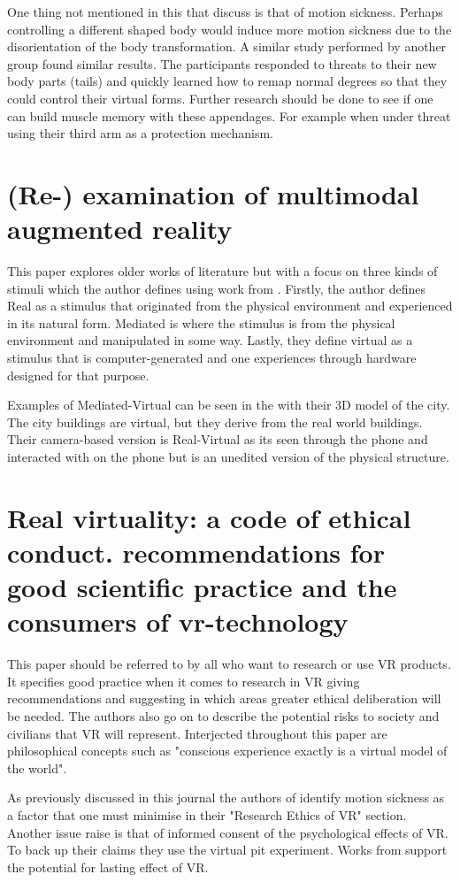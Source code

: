 \documentclass{scrartcl}
\begin{document}
 One thing not mentioned in this that \cite{mentzelopoulos2015hardware} discuss is that of motion sickness. Perhaps controlling a different shaped body would induce more motion sickness due to the disorientation of the body transformation. A similar study performed by another group found similar results\cite{steptoe2013human}. The participants responded to threats to their new body parts (tails) and quickly learned how to remap normal degrees so that they could control their virtual forms. Further research should be done to see if one can build muscle memory with these appendages. For example when under threat using their third arm as a protection mechanism\cite{chafe1996musical}.

\section {(Re-) examination of multimodal augmented reality\cite{rosa2016re}}
This paper explores older works of literature but with a focus on three kinds of stimuli which the author defines using work from \cite{bach2003sensory,milgram1994taxonomy,bayart2006haptic}. Firstly, the author defines Real as a stimulus that originated from the physical environment and experienced in its natural form. Mediated is where the stimulus is from the physical environment and manipulated in some way. Lastly, they define virtual as a stimulus that is computer-generated and one experiences through hardware designed for that purpose. 

Examples of Mediated-Virtual can be seen in the \cite{venta2014investigating} with their 3D model of the city. The city buildings are virtual, but they derive from the real world buildings.  Their camera-based version is Real-Virtual as its seen through the phone and interacted with on the phone but is an unedited version of the physical structure. 

\section {Real virtuality: a code of ethical conduct. recommendations for good scientific practice and the consumers of vr-technology\cite{madary2016real}}
This paper should be referred to by all who want to research or use VR products. It specifies good practice when it comes to research in VR giving recommendations and suggesting in which areas greater ethical deliberation will be needed. The authors also go on to describe the potential risks to society and civilians that VR will represent. Interjected throughout this paper are philosophical concepts such as "conscious experience exactly is a virtual model of the world".

As previously discussed in this journal the authors of \cite{madary2016real} identify motion sickness as a factor that one must minimise in their "Research Ethics of VR" section. Another issue \cite{madary2016real} raise is that of informed consent of the psychological effects of VR.  To back up their claims they use the virtual pit experiment\cite{meehan2002physiological}. Works from \cite{rosenberg2013virtual,hershfield2011increasing,rizzo1998basic} support the potential for lasting effect of VR. 


\end{document}
